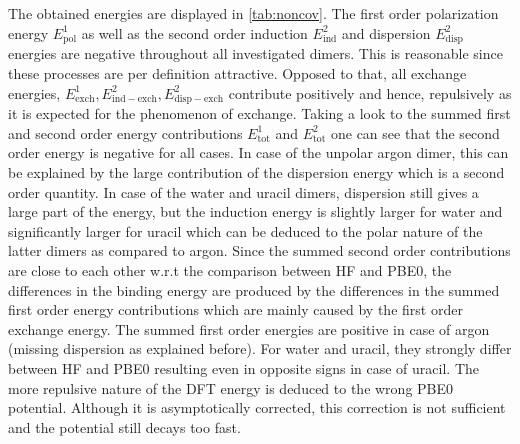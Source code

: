 \documentclass[a4paper,12pt, parskip=half]{scrartcl}
\newcommand{\m}[1]{\mathrm{#1}}
\begin{document}
The obtained energies are displayed in \autoref{tab:noncov}. The first order polarization energy $ E^1_\m{pol} $ as well as the second order induction $ E^2_\m{ind} $ and dispersion $ E^2_\m{disp} $ energies are negative throughout all investigated dimers. This is reasonable since these processes are per definition attractive. Opposed to that, all exchange energies, $ E^1_\m{exch}, E^2_\m{ind-exch}, E^2_\m{disp-exch} $ contribute positively and hence, repulsively as it is expected for the phenomenon of exchange. Taking a look to the summed first and second order energy contributions $ E^1_\m{tot} $ and $ E^2_\m{tot} $ one can see that the second order energy is negative for all cases. In case of the unpolar argon dimer, this can be explained by the large contribution of the dispersion energy which is a second order quantity. In case of the water and uracil dimers, dispersion still gives a large part of the energy, but the induction energy is slightly larger for water and significantly larger for uracil which can be deduced to the polar nature of the latter dimers as compared to argon. Since the summed second order contributions are close to each other w.r.t the comparison between HF and PBE0, the differences in the binding energy are produced by the differences in the summed first order energy contributions which are mainly caused by the first order exchange energy. The summed first order energies are positive in case of argon (missing dispersion as explained before). For water and uracil, they strongly differ between HF and PBE0 resulting even in opposite signs in case of uracil. The more repulsive nature of the DFT energy is deduced to the wrong PBE0 potential. Although it is asymptotically corrected, this correction is not sufficient and the potential still decays too fast.
\end{document}
